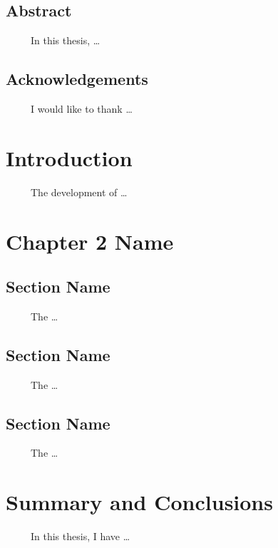 \documentclass[12pt,letterpaper]{report}
\renewcommand{\thepage}{\roman{page}}
\begin{document}
\pagebreak

\section*{\huge{Abstract}}
\ \ \ \ \ In this thesis, \ldots
\pagebreak

\section*{\huge{Acknowledgements}}
\ \ \ \ \ I would like to thank \ldots
\pagebreak

\tableofcontents
\pagebreak

\listoftables
\pagebreak

\listoffigures
\pagebreak

\setcounter{page}{1}
\renewcommand{\thepage}{\arabic{page}}
\chapter{Introduction}
\ \ \ \ \ The development of \ldots
\pagebreak

\chapter{Chapter 2 Name}
\section{Section Name}
\ \ \ \ \ The \ldots

\section{Section Name}
\ \ \ \ \ The \ldots

\section{Section Name}
\ \ \ \ \ The \ldots
\pagebreak
 
\chapter{Summary and Conclusions}
\ \ \ \ \ In this thesis, I have \ldots
\pagebreak
\end{document}
